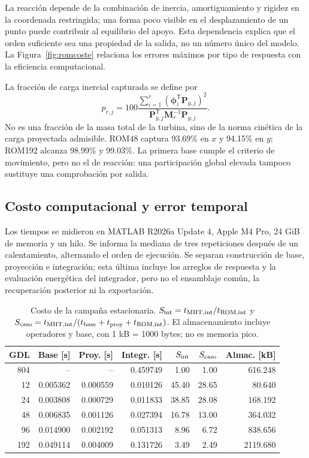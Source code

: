 \documentclass[oneside,a4paper,spanish,links,pagenumbers]{amca}
\newcommand{\tr}{\mathsf T}
\begin{document}
La reacción depende de la combinación de inercia, amortiguamiento y rigidez en la coordenada restringida; una forma poco visible en el desplazamiento de un punto puede contribuir al equilibrio del apoyo. Esta dependencia explica que el orden suficiente sea una propiedad de la salida, no un número único del modelo. La Figura~\ref{fig:romcoste} relaciona los errores máximos por tipo de respuesta con la eficiencia computacional.

La fracción de carga inercial capturada se define por
\begin{equation}
 p_{r,j}=100\frac{\sum_{i=1}^{r}(\bm\phi_i^\tr\bm P_{g,j})^2}
 {\bm P_{g,j}^\tr\bm M_r^{-1}\bm P_{g,j}}.
 \label{eq:participacion}
\end{equation}
No es una fracción de la masa total de la turbina, sino de la norma cinética de la carga proyectada admisible. ROM48 captura 93.69\% en $x$ y 94.15\% en $y$; ROM192 alcanza 98.99\% y 99.03\%. La primera base cumple el criterio de movimiento, pero no el de reacción: una participación global elevada tampoco sustituye una comprobación por salida.

\subsection{Costo computacional y error temporal}
Los tiempos se midieron en MATLAB R2026a Update 4, Apple M4 Pro, 24 GiB de memoria y un hilo. Se informa la mediana de tres repeticiones después de un calentamiento, alternando el orden de ejecución. Se separan construcción de base, proyección e integración; esta última incluye los arreglos de respuesta y la evaluación energética del integrador, pero no el ensamblaje común, la recuperación posterior ni la exportación.

\begin{table}[htbp]\centering\small
\begin{tabular}{rrrrrrr}\toprule
GDL & Base [s] & Proy. [s] & Integr. [s] & $S_{\rm int}$ & $S_{\rm caso}$ & Almac. [kB]\\\midrule
804 &--&--&0.459749&1.00&1.00&616.248\\
12 &0.005362&0.000559&0.010126&45.40&28.65&80.640\\
24 &0.003808&0.000729&0.011833&38.85&28.08&168.192\\
48 &0.006835&0.001126&0.027394&16.78&13.00&364.032\\
96 &0.014900&0.002192&0.051313&8.96&6.72&838.656\\
192 &0.049114&0.004009&0.131726&3.49&2.49&2119.680\\\bottomrule
\end{tabular}
\caption{Costo de la campaña estacionaria. $S_{\rm int}=t_{\rm MHT,int}/t_{\rm ROM,int}$ y $S_{\rm caso}=t_{\rm MHT,int}/(t_{\rm base}+t_{\rm proy}+t_{\rm ROM,int})$. El almacenamiento incluye operadores y base, con 1 kB = 1000 bytes; no es memoria pico.}\label{tab:costos}
\end{table}
\end{document}
